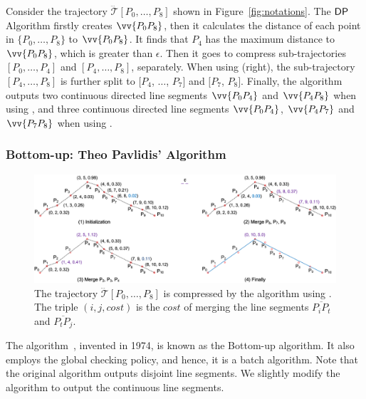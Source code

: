 \begin{example}
\label{exm-alg-lsa}
Consider the trajectory $\dddot{\mathcal{T}}[P_0,\ldots,P_{8}]$ shown in Figure~\ref{fig:notations}.
The ${\mathsf{DP}}$ Algorithm firstly creates $\vv{P_0P_{8}}$, then it calculates the distance of each point in $\{P_0,\ldots,P_{8}\}$ to $\vv{P_0P_{8}}$.
It finds that $P_{4}$ has the maximum distance to $\vv{P_0P_{8}}$, which is greater than $\epsilon$. Then it goes to compress sub-trajectories $[P_0, \ldots, P_{4}]$ and $[P_{4}, \ldots, P_{8}]$, separately.
When using \sed (right), the sub-trajectory $[P_4,\ldots, P_{8}]$ is further split to $[P_4$, $\ldots$, $P_7]$ and $[P_7$, $P_{8}]$.
Finally, the algorithm outputs two continuous directed line segments $\vv{P_0P_4}$ and $\vv{P_4P_8}$ when using \ped, and three continuous directed line segments $\vv{P_0P_4}$, $\vv{P_4P_7}$ and $\vv{P_7P_8}$ when using \sed.
\end{example}



\subsubsection{Bottom-up: Theo Pavlidis' Algorithm}

\begin{figure}[tb!]
\centering
\includegraphics[scale=0.66]{figures/Fig-Pavlidis.png}
\vspace{-1ex}
\caption{\small The trajectory $\dddot{\mathcal{T}}[P_0, \ldots, P_{8}]$ is compressed by the \pavlidis algorithm using \ped. The triple $(i, j, cost)$ is the $cost$ of merging the line segments $\overline{P_iP_t}$ and $\overline{P_tP_j}$. }
\vspace{-2ex}
\label{fig:pavlidis}
\end{figure}

The {\pavlidis algorithm}~\cite{Pavlidis:Segment}, invented in 1974, is known as the Bottom-up algorithm. It also employs the global checking policy, and hence, it is a batch algorithm. Note that the original \pavlidis algorithm outputs disjoint line segments. We slightly modify the algorithm to output the continuous line segments.

